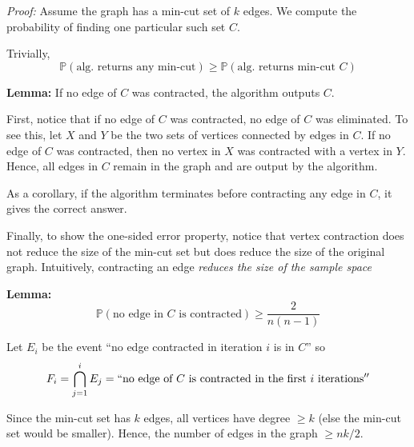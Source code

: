 \documentclass[12pt]{report}
\renewcommand{\P}{\mathbb{P}}
\newenvironment*{tbox}[2][gray]{
    \begin{tcolorbox}[
        parbox=false,
        colback=#1!5!white,
        colframe=#1!75!black,
        breakable,
        title={#2}
    ]}
    {\end{tcolorbox}}
\newenvironment*{proposition}[1][gray]{
    \begin{tcolorbox}[
        parbox=false,
        colback=#1!5!white,
        colframe=#1!75!black,
        breakable
    ]}
    {\end{tcolorbox}}
\begin{document}
\begin{tbox}{\textbf{Theorem:} 
    \begin{enumerate}
        \item The algorithm outputs a min-cut edge-set with probability 
        \[\geq \frac{2}{n(n-1)}\]
        \item The smallest set output in $O(n^2 \log n)$ iterations of the algorithm gives a correct answer with probability $1 - 1/n^2$.
        \end{enumerate}}
    \emph{Proof:} Assume the graph has a min-cut set of $k$ edges. We compute the probability of finding one particular such set $C$.

    Trivially, 
    \[\P(\text{alg. returns any min-cut}) \geq \P(\text{alg. returns min-cut } C)\]

    \begin{proposition}
        \textbf{Lemma:} If no edge of $C$ was contracted, the algorithm outputs $C$. 
    \end{proposition}

    First, notice that if no edge of $C$ was contracted, no edge of $C$ was eliminated. To see this, let $X$ and $Y$ be the two sets of vertices connected by edges in $C$. If no edge of $C$ was contracted, then no vertex in $X$ was contracted with a vertex in $Y$. Hence, all edges in $C$ remain in the graph and are output by the algorithm.

    As a corollary, if the algorithm terminates before contracting any edge in $C$, it gives the correct answer. 

    Finally, to show the one-sided error property, notice that vertex contraction does not reduce the size of the min-cut set but does reduce the size of the original graph. Intuitively, contracting an edge \emph{reduces the size of the sample space}

    \begin{proposition}
        \textbf{Lemma:} 
        \[\P(\text{no edge in } C \text{ is contracted}) \geq \frac{2}{n(n-1)}\]
    \end{proposition}

    Let $E_i$ be the event ``no edge contracted in iteration $i$ is in $C$'' so 
    \[F_i = \bigcap_{j=1}^i E_j = ``\text{no edge of } C \text{ is contracted in the first } i \text{ iterations}''\]
    
    Since the min-cut set has $k$ edges, all vertices have degree $\geq k$ (else the min-cut set would be smaller). Hence, the number of edges in the graph $ \geq nk/2$. 


\end{tbox}
\end{document}
